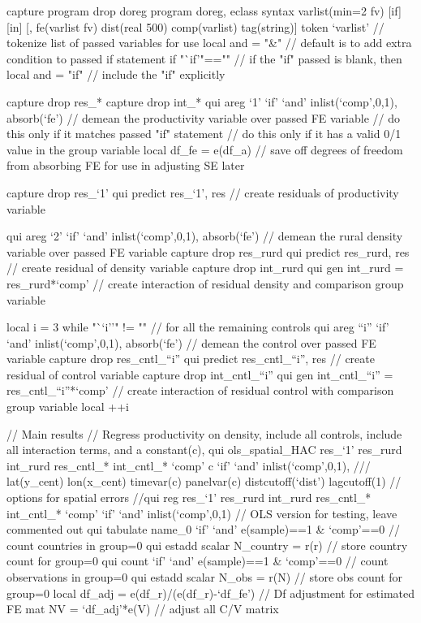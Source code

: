 capture program drop doreg
program doreg, eclass
	syntax varlist(min=2 fv) [if] [in] [, fe(varlist fv) dist(real 500) comp(varlist) tag(string)] 
	token `varlist' // tokenize list of passed variables for use
	local and = "&" // default is to add extra condition to passed if statement
	if "`if'"=="" { // if the "if" passed is blank, then
		local and = "if" // include the "if" explicitly
	}

	capture drop res_*
	capture drop int_*
	qui areg `1' `if' `and' inlist(`comp',0,1), absorb(`fe') // demean the productivity variable over passed FE variable
		// do this only if it matches passed "if" statement
		// do this only if it has a valid 0/1 value in the group variable
	local df_fe = e(df_a) // save off degrees of freedom from absorbing FE for use in adjusting SE later
	
	capture drop res_`1'
	qui predict res_`1', res // create residuals of productivity variable
	
	qui areg `2' `if' `and' inlist(`comp',0,1), absorb(`fe') // demean the rural density variable over passed FE variable
	capture drop res_rurd
	qui predict res_rurd, res // create residual of density variable
	capture drop int_rurd
	qui gen int_rurd = res_rurd*`comp' // create interaction of residual density and comparison group variable
	
	local i = 3 
	while "``i''" != "" { // for all the remaining controls
		qui areg ``i'' `if' `and' inlist(`comp',0,1), absorb(`fe') // demean the control over passed FE variable
		capture drop res_cntl_``i''
		qui predict res_cntl_``i'', res // create residual of control variable
		capture drop int_cntl_``i''
		qui gen int_cntl_``i'' = res_cntl_``i''*`comp' // create interaction of residual control with comparison group variable
		local ++i
	}

	// Main results
	// Regress productivity on density, include all controls, include all interaction terms, and a constant(c), 
	qui ols_spatial_HAC res_`1' res_rurd int_rurd res_cntl_* int_cntl_* `comp' c `if' `and' inlist(`comp',0,1), ///
			lat(y_cent) lon(x_cent) timevar(c) panelvar(c) distcutoff(`dist') lagcutoff(1)	// options for spatial errors
	//qui reg res_`1' res_rurd int_rurd res_cntl_* int_cntl_* `comp' `if' `and' inlist(`comp',0,1) // OLS version for testing, leave commented out
	qui tabulate name_0 `if' `and' e(sample)==1 & `comp'==0 // count countries in group=0
	qui estadd scalar N_country = r(r) // store country count for group=0
	qui count `if' `and' e(sample)==1 & `comp'==0 // count observations in group=0
	qui estadd scalar N_obs = r(N) // store obs count for group=0
	local df_adj = e(df_r)/(e(df_r)-`df_fe') // Df adjustment for estimated FE
	mat NV = `df_adj'*e(V) // adjust all C/V matrix
	
